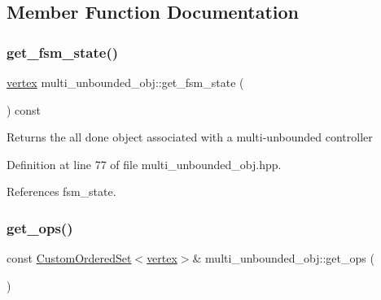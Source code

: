 \subsection{Member Function Documentation}
\mbox{\label{classmulti__unbounded__obj_a022fc9d3e50b0cbf81703dde3f30a4ae}} 
\subsubsection{\texorpdfstring{get\+\_\+fsm\+\_\+state()}{get\_fsm\_state()}}
{\footnotesize\ttfamily \hyperlink{graph_8hpp_abefdcf0544e601805af44eca032cca14}{vertex} multi\+\_\+unbounded\+\_\+obj\+::get\+\_\+fsm\+\_\+state (\begin{DoxyParamCaption}{ }\end{DoxyParamCaption}) const\hspace{0.3cm}{\ttfamily [inline]}}

\begin{DoxyReturn}{Returns}
the all done object associated with a multi-\/unbounded controller 
\end{DoxyReturn}


Definition at line 77 of file multi\+\_\+unbounded\+\_\+obj.\+hpp.



References fsm\+\_\+state.

\mbox{\label{classmulti__unbounded__obj_a53961b624ed6f3bf8e3e89787cad110c}} 
\subsubsection{\texorpdfstring{get\+\_\+ops()}{get\_ops()}}
{\footnotesize\ttfamily const \hyperlink{classCustomOrderedSet}{Custom\+Ordered\+Set}$<$\hyperlink{graph_8hpp_abefdcf0544e601805af44eca032cca14}{vertex}$>$\& multi\+\_\+unbounded\+\_\+obj\+::get\+\_\+ops (\begin{DoxyParamCaption}{ }\end{DoxyParamCaption})\hspace{0.3cm}{\ttfamily [inline]}}



